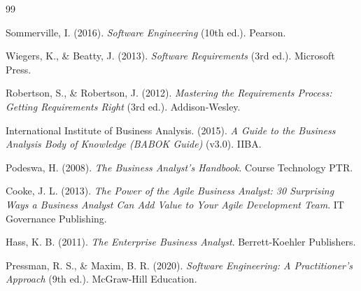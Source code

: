 \documentclass[11pt,a4paper]{article}
\begin{document}
\begin{thebibliography}{99}

	Sommerville, I. (2016).
	\textit{Software Engineering} (10th ed.).
	Pearson.

	Wiegers, K., \& Beatty, J. (2013).
	\textit{Software Requirements} (3rd ed.).
	Microsoft Press.

	Robertson, S., \& Robertson, J. (2012).
	\textit{Mastering the Requirements Process: Getting Requirements Right} (3rd ed.).
	Addison-Wesley.

	International Institute of Business Analysis. (2015).
	\textit{A Guide to the Business Analysis Body of Knowledge (BABOK Guide)} (v3.0).
	IIBA.

	Podeswa, H. (2008).
	\textit{The Business Analyst's Handbook}.
	Course Technology PTR.

	Cooke, J. L. (2013).
	\textit{The Power of the Agile Business Analyst: 30 Surprising Ways a Business Analyst Can Add Value to Your Agile Development Team}.
	IT Governance Publishing.

	Hass, K. B. (2011).
	\textit{The Enterprise Business Analyst}.
	Berrett-Koehler Publishers.

	Pressman, R. S., \& Maxim, B. R. (2020).
	\textit{Software Engineering: A Practitioner's Approach} (9th ed.).
	McGraw-Hill Education.

\end{thebibliography}
\end{document}
